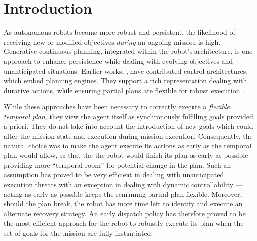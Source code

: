\section{Introduction}
\label{sec:intro}

As autonomous robots become more robust and persistent, the likelihood
of receiving new or modified objectives \emph{during} an ongoing
mission is high. Generative continuous planning, integrated within the
robot's architecture, is one approach to enhance persistence while
dealing with evolving objectives and unanticipated situations.
Earlier works,
\cite{AmbrosIngerson88,Haigh98,alami:1998p820,mus98,chien99,mus04,py10},
have contributed control architectures, which embed planning engines.
They support a rich representation dealing with durative actions,
while ensuring partial plans are flexible for robust execution
\cite{lemai-chenevier2004}.


While these approaches have been necessary to correctly execute a
\emph{flexible temporal plan}, they view the agent itself as
synchronously fulfilling goals provided a priori. They do not take
into account the introduction of new goals which could alter the
mission state and execution during mission execution.  Consequently,
the natural choice was to make the agent execute its actions as early
as the temporal plan would allow, so that the the robot would finish
its plan as early as possible providing more ``temporal room'' for
potential change in the plan. Such an assumption has proved to be very
efficient in dealing with unanticipated execution threats with an
exception in dealing with dynamic controllability \cite{morris01} ---
acting as early as possible keeps the remaining partial plan
flexible. Moreover, should the plan break, the robot has more time
left to identify and execute an alternate recovery strategy. An early
dispatch policy has therefore proved to be the most efficient
approach for the robot to robustly execute its plan when the set of
goals for the mission are fully instantiated.


